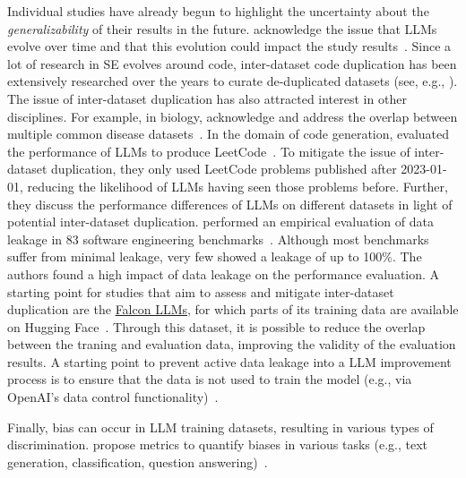 Individual studies have already begun to highlight the uncertainty about the \emph{generalizability} of their results in the future. \citeauthor{DBLP:conf/msr/JesseADM23} acknowledge the issue that LLMs evolve over time and that this evolution could impact the study results~\cite{DBLP:conf/msr/JesseADM23}.
Since a lot of research in SE evolves around code, inter-dataset code duplication has been extensively researched over the years to curate de-duplicated datasets (see, e.g., \cite{DBLP:journals/pacmpl/LopesMMSYZSV17, DBLP:conf/oopsla/Allamanis19, DBLP:journals/ese/KarmakarAR23, DBLP:journals/tse/LopezCSSV25}).
The issue of inter-dataset duplication has also attracted interest in other disciplines. %
For example, in biology, \citeauthor{DBLP:journals/biodb/LakiotakiVTGT18} acknowledge and address the overlap between multiple common disease datasets~\cite{DBLP:journals/biodb/LakiotakiVTGT18}. 
In the domain of code generation, \citeauthor{DBLP:conf/ease/CoignionQR24} evaluated the performance of LLMs to produce LeetCode~\cite{DBLP:conf/ease/CoignionQR24}.
To mitigate the issue of inter-dataset duplication, they only used LeetCode problems published after 2023-01-01, reducing the likelihood of LLMs having seen those problems before.
Further, they discuss the performance differences of LLMs on different datasets in light of potential inter-dataset duplication.
\citeauthor{zhou2025lessleakbenchinvestigationdataleakage} performed an empirical evaluation of data leakage in 83 software engineering benchmarks~\cite{zhou2025lessleakbenchinvestigationdataleakage}.
Although most benchmarks suffer from minimal leakage, very few showed a leakage of up to 100\%.
The authors found a high impact of data leakage on the performance evaluation.
A starting point for studies that aim to assess and mitigate inter-dataset duplication are the \href{https://huggingface.co/datasets/tiiuae/falcon-refinedweb}{Falcon LLMs}, for which parts of its training data are available on Hugging Face~\cite{technology_innovation_institute_2023}.
Through this dataset, it is possible to reduce the overlap between the traning and evaluation data, improving the validity of the evaluation results.
A starting point to prevent active data leakage into a LLM improvement process is to ensure that the data is not used to train the model (e.g., via OpenAI's data control functionality)~\cite{DBLP:conf/eacl/BalloccuSLD24}.

Finally, bias can occur in LLM training datasets, resulting in various types of discrimination.
\citeauthor{DBLP:journals/corr/abs-2309-00770} propose metrics to quantify biases in various tasks (e.g., text generation, classification, question answering)~\cite{DBLP:journals/corr/abs-2309-00770}.

